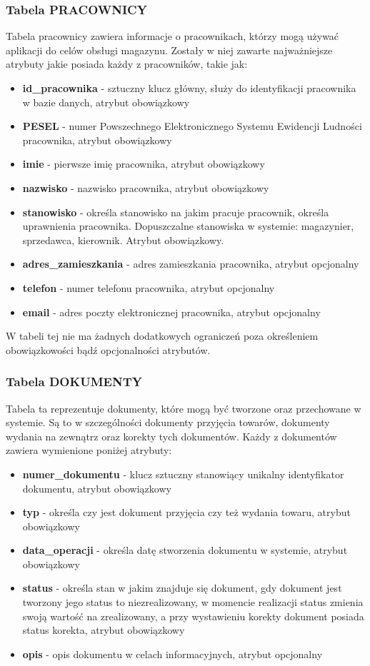 \subsubsection{Tabela PRACOWNICY}
Tabela pracownicy zawiera informacje o pracownikach, którzy mogą używać
aplikacji do celów obsługi magazynu. Zostały w niej zawarte najważniejsze atrybuty jakie posiada każdy z
pracowników, takie jak:
\begin{itemize}
  \item \textbf{id\_pracownika} - sztuczny klucz główny, służy do identyfikacji
  pracownika w bazie danych, atrybut obowiązkowy
  \item \textbf{PESEL} - numer Powszechnego Elektronicznego Systemu Ewidencji
  Ludności pracownika, atrybut obowiązkowy
  \item \textbf{imie} - pierwsze imię pracownika, atrybut obowiązkowy
  \item \textbf{nazwisko} - nazwisko pracownika, atrybut obowiązkowy
  \item \textbf{stanowisko} - określa stanowisko na jakim pracuje pracownik,
  określa uprawnienia pracownika. Dopuszczalne stanowiska w systemie: magazynier,
  sprzedawca, kierownik. Atrybut obowiązkowy.
  \item \textbf{adres\_zamieszkania} - adres zamieszkania pracownika, atrybut
  opcjonalny
  \item \textbf{telefon} - numer telefonu pracownika, atrybut opcjonalny
  \item \textbf{email} - adres poczty elektronicznej pracownika, atrybut
  opcjonalny
\end{itemize}

W tabeli tej nie ma żadnych dodatkowych ograniczeń poza określeniem
obowiązkowości bądź opcjonalności atrybutów.

\subsubsection{Tabela DOKUMENTY}
Tabela ta reprezentuje dokumenty, które mogą być tworzone oraz przechowane w
systemie. Są to w szczególności dokumenty przyjęcia towarów, dokumenty wydania
na zewnątrz oraz korekty tych dokumentów. Każdy z dokumentów zawiera wymienione
poniżej atrybuty:
\begin{itemize}
  \item \textbf{numer\_dokumentu} - klucz sztuczny stanowiący unikalny
  identyfikator dokumentu, atrybut obowiązkowy
  \item \textbf{typ} - określa czy jest dokument przyjęcia czy też wydania
  towaru, atrybut obowiązkowy
  \item \textbf{data\_operacji} - określa datę stworzenia dokumentu w systemie,
  atrybut obowiązkowy
  \item \textbf{status} - określa stan w jakim znajduje się dokument, gdy
  dokument jest tworzony jego status to niezrealizowany, w momencie realizacji
  status zmienia swoją wartość na zrealizowany, a przy wystawieniu korekty
  dokument posiada status korekta, atrybut obowiązkowy
  \item \textbf{opis} - opis dokumentu w celach informacyjnych, atrybut
  opcjonalny
\end{itemize}

